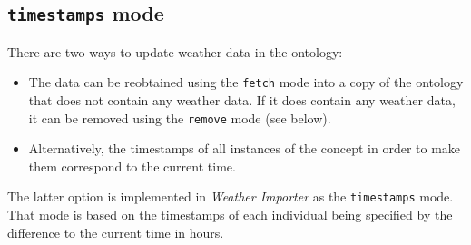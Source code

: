 \subsection{\texttt{timestamps} mode}

There are two ways to update weather data in the \smarthomeweather ontology:
\begin{itemize}
  \item The data can be reobtained using the \texttt{fetch} mode into a copy of the ontology that does not contain any weather data. If it does contain any weather data, it can be removed using the \texttt{remove} mode (see below).
  \item Alternatively, the timestamps of all instances of the  concept in order to make them correspond to the current time. %
\end{itemize}

The latter option is implemented in \emph{Weather Importer} as the \texttt{timestamps} mode. That mode is based on the timestamps of each  individual being specified by the difference to the current time in hours.

